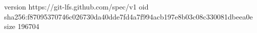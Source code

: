 version https://git-lfs.github.com/spec/v1
oid sha256:f87095370746c026730da40dde7fd4a7f994acb197e8b03c08c330081dbeea0e
size 196704
